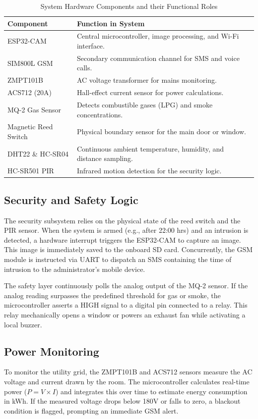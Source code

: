 \documentclass[12pt,a4paper]{article}
\begin{document}
\begin{table}[H]
\centering
\caption{System Hardware Components and their Functional Roles}
\label{tab:components}
\begin{tabular}{|l|p{9cm}|}
\hline
\textbf{Component} & \textbf{Function in System} \\ \hline
ESP32-CAM & Central microcontroller, image processing, and Wi-Fi interface. \\ \hline
SIM800L GSM & Secondary communication channel for SMS and voice calls. \\ \hline
ZMPT101B & AC voltage transformer for mains monitoring. \\ \hline
ACS712 (20A) & Hall-effect current sensor for power calculations. \\ \hline
MQ-2 Gas Sensor & Detects combustible gases (LPG) and smoke concentrations. \\ \hline
Magnetic Reed Switch & Physical boundary sensor for the main door or window. \\ \hline
DHT22 \& HC-SR04 & Continuous ambient temperature, humidity, and distance sampling. \\ \hline
HC-SR501 PIR & Infrared motion detection for the security logic. \\ \hline
\end{tabular}
\end{table}

\subsection{Security and Safety Logic}
The security subsystem relies on the physical state of the reed switch and the PIR sensor. When the system is armed (e.g., after 22:00 hrs) and an intrusion is detected, a hardware interrupt triggers the ESP32-CAM to capture an image. This image is immediately saved to the onboard SD card. Concurrently, the GSM module is instructed via UART to dispatch an SMS containing the time of intrusion to the administrator's mobile device.

The safety layer continuously polls the analog output of the MQ-2 sensor. If the analog reading surpasses the predefined threshold for gas or smoke, the microcontroller asserts a HIGH signal to a digital pin connected to a relay. This relay mechanically opens a window or powers an exhaust fan while activating a local buzzer.

\subsection{Power Monitoring}
To monitor the utility grid, the ZMPT101B and ACS712 sensors measure the AC voltage and current drawn by the room. The microcontroller calculates real-time power ($P = V \times I$) and integrates this over time to estimate energy consumption in kWh. If the measured voltage drops below 180V or falls to zero, a blackout condition is flagged, prompting an immediate GSM alert.
\end{document}
